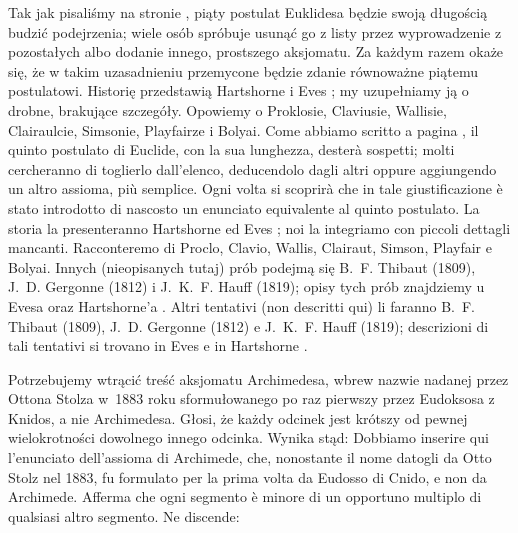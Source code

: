\label{sekcja_piaty_postulat}

Tak jak pisaliśmy na stronie \pageref{pageref:fifth_postulate}, piąty postulat Euklidesa będzie swoją długością budzić podejrzenia; wiele osób spróbuje usunąć go z listy przez wyprowadzenie z pozostałych albo dodanie innego, prostszego aksjomatu. %
Za każdym razem okaże się, że w takim uzasadnieniu przemycone będzie zdanie równoważne piątemu postulatowi. %
Historię przedstawią Hartshorne \cite[s. 296-304]{hartshorne_2000} i Eves \cite[s. 283-288]{eves1_1972}; my uzupełniamy ją o drobne, brakujące szczegóły. %
Opowiemy o Proklosie, Claviusie, Wallisie, Clairaulcie, Simsonie, Playfairze i Bolyai. %
Come abbiamo scritto a pagina \pageref{pageref:fifth_postulate}, il quinto postulato di Euclide, con la sua lunghezza, desterà sospetti; molti cercheranno di toglierlo dall'elenco, deducendolo dagli altri oppure aggiungendo un altro assioma, più semplice. %
Ogni volta si scoprirà che in tale giustificazione è stato introdotto di nascosto un enunciato equivalente al quinto postulato. %
La storia la presenteranno Hartshorne \cite[p. 296-304]{hartshorne_2000} ed Eves \cite[p. 283-288]{eves1_1972}; noi la integriamo con piccoli dettagli mancanti. %
Racconteremo di Proclo, Clavio, Wallis, Clairaut, Simson, Playfair e Bolyai. %
Innych (nieopisanych tutaj) prób podejmą się B.~F. Thibaut (1809), J.~D. Gergonne (1812) i J.~K.~F. Hauff (1819); opisy tych prób znajdziemy u Evesa \cite[s. 289]{eves1_1972} oraz Hartshorne'a \cite[s. 304]{hartshorne_2000}. %
Altri tentativi (non descritti qui) li faranno B.~F. Thibaut (1809), J.~D. Gergonne (1812) e J.~K.~F. Hauff (1819); descrizioni di tali tentativi si trovano in Eves \cite[p. 289]{eves1_1972} e in Hartshorne \cite[p. 304]{hartshorne_2000}. %

Potrzebujemy wtrącić treść aksjomatu Archimedesa, wbrew nazwie nadanej przez Ottona Stolza w~1883 roku sformułowanego po raz pierwszy przez Eudoksosa z Knidos, a nie Archimedesa. %
Głosi, że każdy odcinek jest krótszy od pewnej wielokrotności dowolnego innego odcinka. %
Wynika stąd: %
Dobbiamo inserire qui l'enunciato dell'assioma di Archimede, che, nonostante il nome datogli da Otto Stolz nel 1883, fu formulato per la prima volta da Eudosso di Cnido, e non da Archimede. %
Afferma che ogni segmento è minore di un opportuno multiplo di qualsiasi altro segmento. %
Ne discende: %

